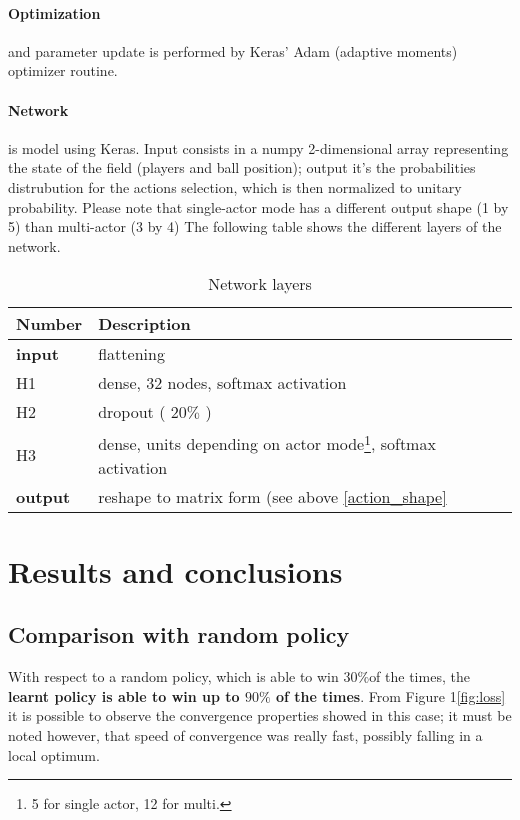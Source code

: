 \documentclass{article}
\begin{document}
\label{optimization}
\paragraph{Optimization} and parameter update is performed by Keras' Adam (adaptive moments) optimizer routine.

\paragraph{Network} is model using Keras. Input consists in a numpy 2-dimensional array representing the state of the field (players and ball position); output it's the probabilities distrubution for the actions selection, which is then normalized to unitary probability. \label{action_shape}Please note that single-actor mode has a different output shape (1 by 5) than multi-actor (3 by 4) The following table shows the different layers of the network.
\label{network}
\begin{table}[H]
  \caption{Network layers}
  \label{network_table}
  \centering
  \begin{tabular}{lll}
    Number     &  Description\\
    \midrule
    \textbf{input} & flattening\\
    H1 & dense, 32 nodes, softmax activation\\
    H2  & dropout ( $20\%$ ) \\
    H3 & dense, units depending on actor mode\footnote{5 for single actor, 12 for multi.}, softmax activation\\
   \textbf{output} & reshape to matrix form (see above \ref{action_shape}\\
    \bottomrule
  \end{tabular}
\end{table}
\section{Results and conclusions}
\label{results}
\subsection{Comparison with random policy}
With respect to a random policy, which is able to win  $30\%$of the times, the \textbf{learnt policy is able to win up to  $90\%$ of the times}.\newline
From Figure 1\ref{fig:loss} it is possible to observe the convergence properties showed in this case; it must be noted however, that speed of convergence was really fast, possibly falling in a local optimum.
\end{document}
